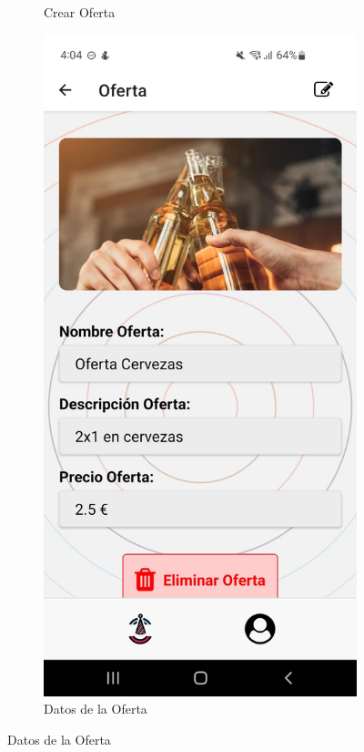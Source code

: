 \begin{figure}[H]
\begin{subfigure}{0.45\textwidth}
        \caption{Crear Oferta}
        \label{fig:img5}
    \end{subfigure}%
    \hfill
    \begin{subfigure}{0.45\textwidth}
        \centering
        \includegraphics[width=\linewidth]{imagenes/Capturas/DatosOferta.jpeg}
        \caption{Datos de la Oferta}
        \label{fig:img6}
    \end{subfigure}
\end{figure}
\vspace*{\fill}

